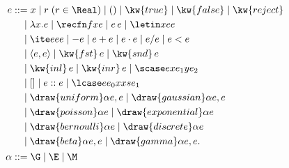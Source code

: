 \begin{minipage}{0.49\textwidth}
\centering
\small
\quad\begin{align*}
\  e &::= x\mid r\;(r\in\Real)\mid ()\mid\kw{true}\mid\kw{false}\mid\kw{reject}\\
   &\quad\mid \lambda x.e\mid\recfn f x e\mid e\,e
       \mid\letin x e e\\
   &\quad\mid \ite e e e\mid -e\mid e+e\mid e\cdot e\mid e/e\mid e<e\\
   &\quad\mid \langle e,e\rangle\mid\kw{fst}\,e\mid\kw{snd}\,e\\
   &\quad\mid \kw{inl}\,e\mid\kw{inr}\,e\mid\scase e x{e_1}y{e_2}\\
   &\quad\mid []\mid e::e\mid\lcase e{e_0}x{xs}{e_1}\\
   &\quad\mid \draw{uniform}\alpha{e,e}\mid\draw{gaussian}\alpha{e,e}\\
   &\quad\mid \draw{poisson}\alpha e\mid\draw{exponential}\alpha e\\
   &\quad\mid \draw{bernoulli}\alpha e\mid\draw{discrete}\alpha e\\
   &\quad\mid \draw{beta}\alpha{e,e}\mid\draw{gamma}\alpha{e,e}.\\[1pt]
\  \alpha &::= \G\mid\E\mid\M\\[-3em]
\end{align*}
\label{fig:syntax}
\end{minipage}